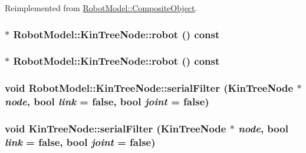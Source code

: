 Reimplemented from \hyperlink{class_robot_model_1_1_composite_object_aee43da74b22f6272736844effe7a1dd6}{RobotModel::CompositeObject}.\hypertarget{class_robot_model_1_1_kin_tree_node_a7bd810e1df470e3d8801ac8f1aa0a60f}{
\subsubsection[{robot}]{$\ast$ RobotModel::KinTreeNode::robot () const}}
\label{class_robot_model_1_1_kin_tree_node_a7bd810e1df470e3d8801ac8f1aa0a60f}
\hypertarget{class_robot_model_1_1_kin_tree_node_a7bd810e1df470e3d8801ac8f1aa0a60f}{
\subsubsection[{robot}]{$\ast$ RobotModel::KinTreeNode::robot () const}}
\label{class_robot_model_1_1_kin_tree_node_a7bd810e1df470e3d8801ac8f1aa0a60f}
\hypertarget{class_robot_model_1_1_kin_tree_node_ac1aaeb1bf262448d159f9648a190c167}{
\subsubsection[{serialFilter}]{\setlength{\rightskip}{0pt plus 5cm}void RobotModel::KinTreeNode::serialFilter ({\bf KinTreeNode} $\ast$ {\em node}, \/  bool {\em link} = {\ttfamily false}, \/  bool {\em joint} = {\ttfamily false})}}
\label{class_robot_model_1_1_kin_tree_node_ac1aaeb1bf262448d159f9648a190c167}
\hypertarget{class_robot_model_1_1_kin_tree_node_adc5e295285315ab45b65c1dceeee1770}{
\subsubsection[{serialFilter}]{\setlength{\rightskip}{0pt plus 5cm}void KinTreeNode::serialFilter ({\bf KinTreeNode} $\ast$ {\em node}, \/  bool {\em link} = {\ttfamily false}, \/  bool {\em joint} = {\ttfamily false})}}
